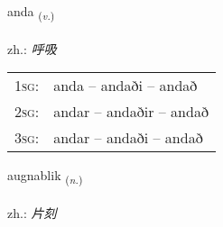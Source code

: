 \documentclass[frontgrid, backgrid]{flacards}\usepackage[]{graphicx}\usepackage[]{xcolor}
\begin{document}
\renewcommand{\blhead}{\vskip5pt {\small\bfseries\footnotesize Sagnorð | 动词 }}
\renewcommand{\bcfoot}{\vskip5pt \hspace{2pt}{\small\bfseries\footnotesize 3K}}


{anda \small{\textsubscript{(\textit{v.})}} \\[1ex] %
\textphonetic{[anta]} \\
zh.: \emph{呼吸} \\  [2ex]
\renewcommand*{\arraystretch}{0.8}
\begin{tabular}{p{1cm}l}
\textsc{1sg}: & anda -- andaði -- andað \\ 
\textsc{2sg}: & andar -- andaðir -- andað \\ 
\textsc{3sg}: & andar -- andaði -- andað \\ 
\end{tabular}
}

\renewcommand{\flhead}{\vskip5pt \fboxsep=0pt {\small\bfseries\footnotesize Nafnorð | 名词}}
\renewcommand{\fcfoot}{\vskip5pt \fboxsep=0pt \hspace{2pt}{\small\bfseries\footnotesize 3K}}

\renewcommand{\blhead}{\vskip5pt {\small\bfseries\footnotesize Nafnorð | 名词 }}
\renewcommand{\bcfoot}{\vskip5pt \hspace{2pt}{\small\bfseries\footnotesize 3K}}


{augnablik \small{\textsubscript{(\textit{n.})}} \\[1ex] %
\textphonetic{[œiknaplɪk]} \\
zh.: \emph{片刻} \\  [2ex]
\renewcommand*{\arraystretch}{0.8}
}

\renewcommand{\flhead}{\vskip5pt \fboxsep=0pt {\small\bfseries\footnotesize Nafnorð | 名词}}
\renewcommand{\fcfoot}{\vskip5pt \fboxsep=0pt \hspace{2pt}{\small\bfseries\footnotesize 3K}}
\end{document}
